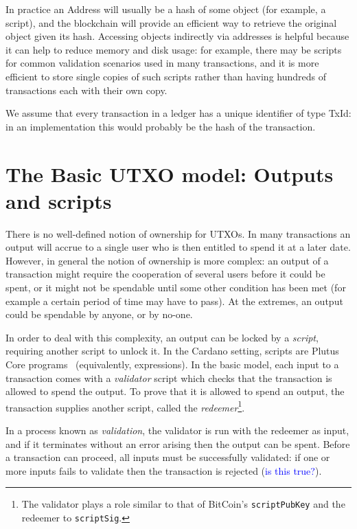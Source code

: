 \documentclass[a4paper]{article}
\newcommand{\blue}[1]{\textcolor{blue}{#1}}
\renewcommand{\i}{\textit}  %
\newcommand{\s}{\textsf}  %
\theoremstyle{definition}  %
\begin{document}
\noindent In practice an \textsf{Address} will usually be a hash of
some object (for example, a script), and the blockchain will provide
an efficient way to retrieve the original object given its hash.
Accessing objects indirectly via addresses is helpful because it can
help to reduce memory and disk usage: for example, there may be
scripts for common validation scenarios used in many transactions, and
it is more efficient to store single copies of such scripts rather
than having hundreds of transactions each with their own copy.

We assume that every transaction in a ledger has a unique identifier
of type \s{TxId}: in an implementation this would probably be the
hash of the transaction.





\section{The Basic UTXO model: Outputs and scripts}
\label{sec:utxo-intro}

There is no well-defined notion of ownership for UTXOs.  In many
transactions an output will accrue to a single user who is then
entitled to spend it at a later date.  However, in general the notion
of ownership is more complex: an output of a transaction might require
the cooperation of several users before it could be spent, or it might
not be spendable until some other condition has been met (for example
a certain period of time may have to pass).  At the extremes, an
output could be spendable by anyone, or by no-one.

In order to deal with this complexity, an output can be locked by a
\textit{script}, requiring another script to unlock it.  In the
Cardano setting, scripts are Plutus Core
programs~\cite{Plutus-Core-spec} (equivalently, expressions).  In the
basic model, each input to a transaction comes with a \i{validator}
script which checks that the transaction is allowed to spend the
output. To prove that it is allowed to spend an output, the
transaction supplies another script, called the \i{redeemer}\footnote{
  The validator plays a role similar to that of BitCoin's
  \texttt{scriptPubKey} and the redeemer to \texttt{scriptSig}.}.

In a process known as \i{validation}, the validator is run with the
redeemer as input, and if it terminates without an error arising then
the output can be spent.  Before a transaction can proceed, all inputs
must be successfully validated: if one or more inputs fails to validate
then the transaction is rejected (\blue{is this true?}).
\end{document}
